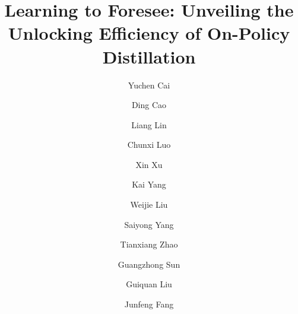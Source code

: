 \documentclass{llmxive}
\title{Learning to Foresee: Unveiling the Unlocking Efficiency of On-Policy Distillation}
\author{Yuchen Cai \and Ding Cao \and Liang Lin \and Chunxi Luo \and Xin Xu \and Kai Yang \and Weijie Liu \and Saiyong Yang \and Tianxiang Zhao \and Guangzhong Sun \and Guiquan Liu \and Junfeng Fang}
\begin{document}
\maketitle
\begin{abstract}


\end{abstract}
\end{document}
